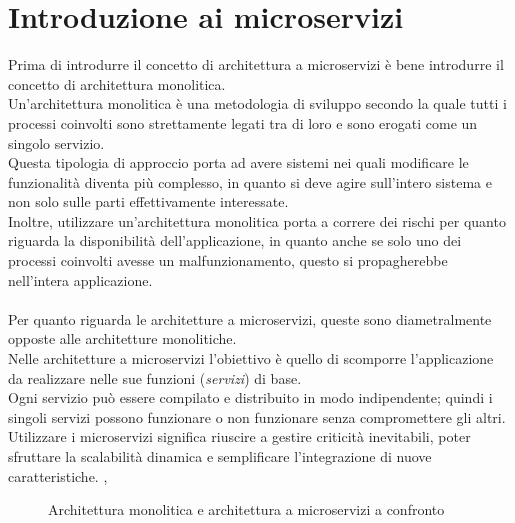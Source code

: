 \section{Introduzione ai microservizi}\label{sec:microserviziintro}
Prima di introdurre il concetto di architettura a microservizi è bene introdurre il concetto di architettura monolitica.\\
Un'architettura monolitica è una metodologia di sviluppo secondo la quale tutti i processi coinvolti sono strettamente legati tra di loro e sono erogati 
come un singolo servizio.\\
Questa tipologia di approccio porta ad avere sistemi nei quali modificare le funzionalità diventa più complesso, in quanto si deve agire sull'intero sistema e non 
solo sulle parti effettivamente interessate.\\
Inoltre, utilizzare un'architettura monolitica porta a correre dei rischi per quanto riguarda la disponibilità dell'applicazione, in quanto anche se solo uno dei 
processi coinvolti avesse un malfunzionamento, questo si propagherebbe nell'intera applicazione.\\ \\
Per quanto riguarda le architetture a microservizi, queste sono diametralmente opposte alle architetture monolitiche.\\
Nelle architetture a microservizi l'obiettivo è quello di scomporre l'applicazione da realizzare nelle sue funzioni (\emph{servizi}) di base.\\
Ogni servizio può essere compilato e distribuito in modo indipendente; quindi i singoli servizi possono funzionare o non funzionare senza compromettere gli altri.\\
Utilizzare i microservizi significa riuscire a gestire criticità inevitabili, poter sfruttare la scalabilità dinamica e semplificare l'integrazione 
di nuove caratteristiche. \cite{RedHatMicroservices}, \cite{Amazon}\\

\begin{figure}[ht]
	\centering
	\caption{Architettura monolitica e architettura a microservizi a confronto}
	\label{fig:one}
\end{figure}

